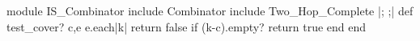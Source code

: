 \begin{rubyblock}
module IS_Combinator
  include Combinator
  include Two_Hop_Complete |; \label{line:two-complete} ;|
  def test_cover? c,e
    e.each{|k| return false if (k-c).empty?}
    return true
  end
end
\end{rubyblock}
